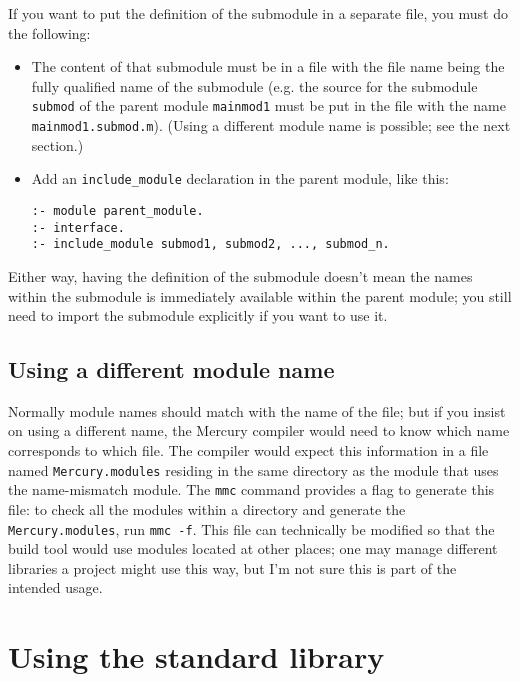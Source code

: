 If you want to put the definition of the submodule in a separate file, you must do the following:

\begin{itemize}
\item The content of that submodule must be in a file with the file name being the fully qualified name of the submodule (e.g. the source for the submodule \texttt{submod} of the parent module \texttt{mainmod1} must be put in the file with the name \texttt{mainmod1.submod.m}). (Using a different module name is possible; see the next section.)
\item Add an \texttt{include\_module} declaration in the parent module, like this:
\begin{lstlisting}[language=Mercury]
:- module parent_module.
:- interface.
:- include_module submod1, submod2, ..., submod_n.
\end{lstlisting}
\end{itemize}

Either way, having the definition of the submodule doesn't mean the names within the submodule is immediately available within the parent module; you still need to import the submodule explicitly if you want to use it.


\subsection{Using a different module name}

Normally module names should match with the name of the file; but if you insist on using a different name, the Mercury compiler would need to know which name corresponds to which file. The compiler would expect this information in a file named \texttt{Mercury.modules} residing in the same directory as the module that uses the name-mismatch module. The \texttt{mmc} command provides a flag to generate this file: to check all the modules within a directory and generate the \texttt{Mercury.modules}, run \texttt{mmc -f}. This file can technically be modified so that the build tool would use modules located at other places; one may manage different libraries a project might use this way, but I'm not sure this is part of the intended usage.

\section{Using the standard library}

